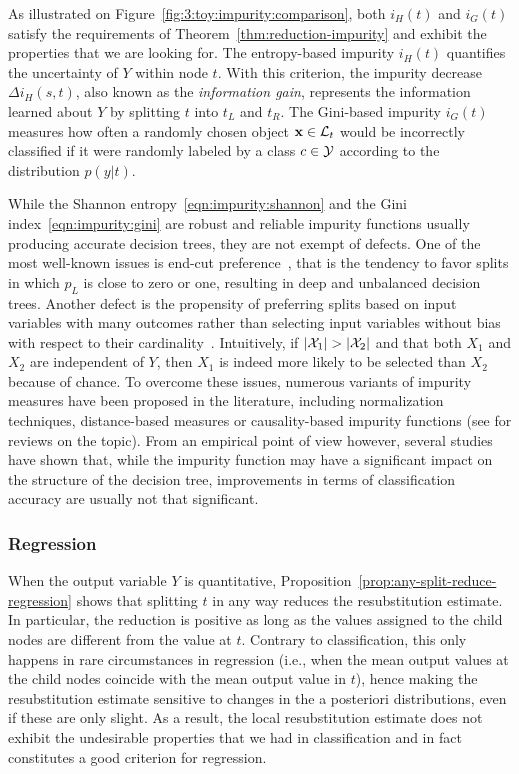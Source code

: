 As illustrated on Figure~\ref{fig:3:toy:impurity:comparison}, both $i_H(t)$ and
$i_G(t)$ satisfy the requirements of Theorem~\ref{thm:reduction-impurity} and
exhibit the properties that we are looking for. The entropy-based impurity
$i_H(t)$ quantifies the uncertainty of $Y$ within node $t$. With this
criterion, the impurity decrease $\Delta i_H(s,t)$, also known as the
\textit{information gain}, represents the information learned about
$Y$ by splitting $t$ into $t_L$ and $t_R$. The Gini-based impurity $i_G(t)$
measures how often a randomly chosen object $\mathbf{x}\in {\cal L}_t$ would be
incorrectly classified if it were randomly labeled by a class $c\in{\cal Y}$ according
to the distribution $p(y|t)$.

While the Shannon entropy~\ref{eqn:impurity:shannon} and the Gini
index~\ref{eqn:impurity:gini} are robust and reliable impurity functions
usually producing accurate decision trees, they are not exempt of defects. One
of the most well-known issues is end-cut
preference~\citep{morgan:1973,breiman:1984}, that is the tendency to favor
splits in which $p_L$ is close to zero or one, resulting in deep and unbalanced
decision trees. Another defect is the propensity of preferring splits based on
input variables with many outcomes rather than selecting input variables
without bias with respect to their
cardinality~\citep{quinlan:1986,strobl:2007}. Intuitively, if $|{\cal X}_1| >
|{\cal X}_2|$ and that both $X_1$ and $X_2$ are independent of $Y$, then $X_1$
is indeed more likely to be selected than $X_2$  because of chance. To overcome
these issues, numerous variants of impurity measures have been proposed in the
literature, including normalization techniques, distance-based measures or
causality-based impurity functions (see \citep{wehenkel:1996,zighed:2000,maimon:2005} for
reviews on the topic). From an empirical point of view however,  several
studies~\citep{mingers:1989b,miyakawa:1989,mantaras:1991} have shown that,
while the impurity function may have a significant impact on the structure of
the decision tree, improvements in terms of classification accuracy are
usually not that significant.

\subsubsection{Regression}
\label{sec:3:criteria:regression}

When the output variable $Y$ is quantitative, Proposition~\ref{prop:any-split-reduce-regression}
shows that splitting $t$ in any way reduces the
resubstitution estimate. In particular, the reduction is positive as long as
the values assigned to the child nodes are different from the value at $t$.
Contrary to classification, this only happens in rare circumstances in
regression (i.e., when the mean output values at the child nodes coincide with the
mean output value in $t$), hence making the resubstitution estimate sensitive to changes
in the a posteriori distributions, even if these are only slight.  As a result, the
local resubstitution estimate does not exhibit the undesirable properties that
we had in classification and in fact constitutes a good criterion for
regression.

